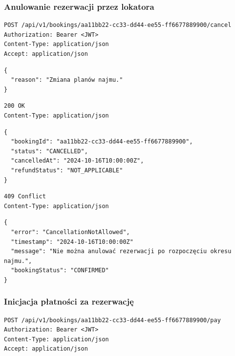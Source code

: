 \documentclass[11pt, a4paper]{article}
\begin{document}
\subsubsection{Anulowanie rezerwacji przez lokatora}

\begin{lstlisting}[style=http,caption={Żądanie HTTP — anulowanie rezerwacji}]
POST /api/v1/bookings/aa11bb22-cc33-dd44-ee55-ff6677889900/cancel
Authorization: Bearer <JWT>
Content-Type: application/json
Accept: application/json
\end{lstlisting}

\begin{lstlisting}[style=json,caption={Ciało żądania — anulowanie rezerwacji}]
{
  "reason": "Zmiana planów najmu."
}
\end{lstlisting}

\begin{lstlisting}[style=http,caption={Odpowiedź HTTP — anulowanie rezerwacji, sukces}]
200 OK
Content-Type: application/json
\end{lstlisting}

\begin{lstlisting}[style=json,caption={Ciało odpowiedzi — anulowanie rezerwacji, sukces}]
{
  "bookingId": "aa11bb22-cc33-dd44-ee55-ff6677889900",
  "status": "CANCELLED",
  "cancelledAt": "2024-10-16T10:00:00Z",
  "refundStatus": "NOT_APPLICABLE"
}
\end{lstlisting}

\begin{lstlisting}[style=http,caption={Odpowiedź HTTP — anulowanie rezerwacji, błąd}]
409 Conflict
Content-Type: application/json
\end{lstlisting}

\begin{lstlisting}[style=json,caption={Ciało odpowiedzi — anulowanie rezerwacji, błąd}]
{
  "error": "CancellationNotAllowed",
  "timestamp": "2024-10-16T10:00:00Z"
  "message": "Nie można anulować rezerwacji po rozpoczęciu okresu najmu.",
  "bookingStatus": "CONFIRMED"
}
\end{lstlisting}

\subsubsection{Inicjacja płatności za rezerwację}

\begin{lstlisting}[style=http,caption={Żądanie HTTP — inicjacja płatności}]
POST /api/v1/bookings/aa11bb22-cc33-dd44-ee55-ff6677889900/pay
Authorization: Bearer <JWT>
Content-Type: application/json
Accept: application/json
\end{lstlisting}
\end{document}
